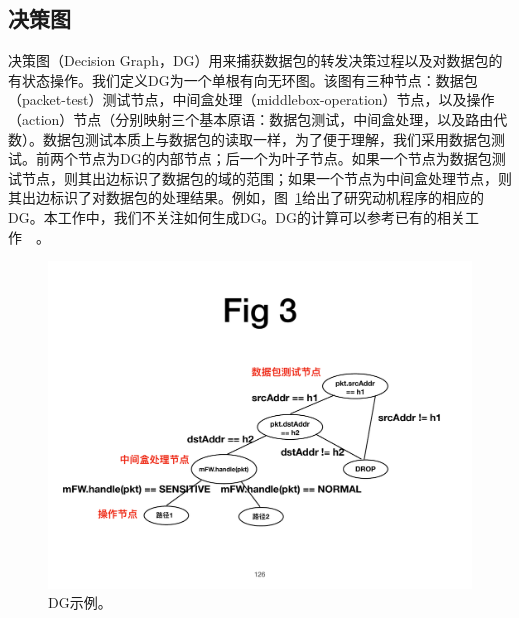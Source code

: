 \documentclass{ctexart}
\begin{document}
\subsection{决策图}

决策图（Decision Graph，DG）用来捕获数据包的转发决策过程以及对数据包的有状态操作。我们定义DG为一个单根有向无环图。该图有三种节点：数据包（packet-test）测试节点，中间盒处理（middlebox-operation）节点，以及操作（action）节点（分别映射三个基本原语：数据包测试，中间盒处理，以及路由代数）。数据包测试本质上与数据包的读取一样，为了便于理解，我们采用数据包测试。前两个节点为DG的内部节点；后一个为叶子节点。如果一个节点为数据包测试节点，则其出边标识了数据包的域的范围；如果一个节点为中间盒处理节点，则其出边标识了对数据包的处理结果。例如，图~\ref{fig:dg-example}给出了研究动机程序的相应的DG。本工作中，我们不关注如何生成DG。DG的计算可以参考已有的相关工作~\cite{arashloo2016snap}~\cite{smolka2015fast}。


\begin{figure}[!htbp]
\centering
      \centering\includegraphics[width=\linewidth]{figures/ss-126.pdf}
\caption{DG示例。}
\label{fig:dg-example}
\end{figure}
\end{document}

